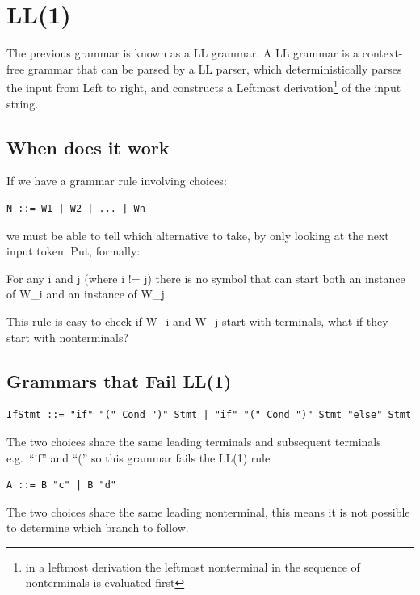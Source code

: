 \documentclass[
]{book}
\begin{document}
\hypertarget{ll1}{%
\section{LL(1)}\label{ll1}}

The previous grammar is known as a LL grammar. A LL grammar is a context-free grammar that can be parsed by a LL parser, which deterministically parses the input from Left to right, and constructs a Leftmost derivation\footnote{in a leftmost derivation the leftmost nonterminal in the sequence of nonterminals is evaluated first} of the input string.

\hypertarget{when-does-it-work}{%
\subsection{When does it work}\label{when-does-it-work}}

If we have a grammar rule involving choices:

\begin{verbatim}
N ::= W1 | W2 | ... | Wn
\end{verbatim}

we must be able to tell which alternative to take, by only looking at the next input token. Put, formally:

For any i and j (where i != j) there is no symbol that can start both an instance of W\_i and an instance of W\_j.

This rule is easy to check if W\_i and W\_j start with terminals, what if they start with nonterminals?

\hypertarget{grammars-that-fail-ll1}{%
\subsection{Grammars that Fail LL(1)}\label{grammars-that-fail-ll1}}

\begin{verbatim}
IfStmt ::= "if" "(" Cond ")" Stmt | "if" "(" Cond ")" Stmt "else" Stmt
\end{verbatim}

The two choices share the same leading terminals and subsequent terminals e.g.~``if'' and ``('' so this grammar fails the LL(1) rule

\begin{verbatim}
A ::= B "c" | B "d"
\end{verbatim}

The two choices share the same leading nonterminal, this means it is not possible to determine which branch to follow.
\end{document}
